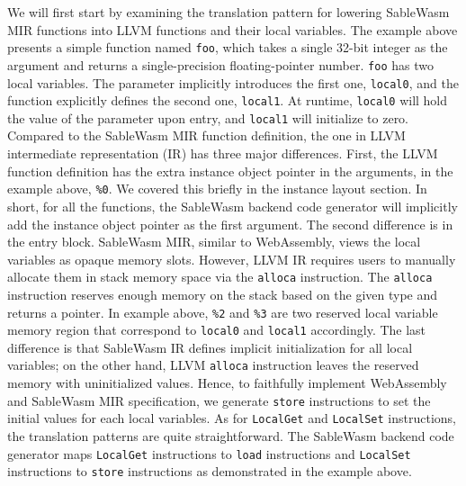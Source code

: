 We will first start by examining the translation pattern for lowering SableWasm
MIR functions into LLVM functions and their local variables. The example above
presents a simple function named \texttt{foo}, which takes a single 32-bit
integer as the argument and returns a single-precision floating-pointer number.
\texttt{foo} has two local variables. The parameter implicitly introduces the
first one, \texttt{local0}, and the function explicitly defines the second one,
\texttt{local1}. At runtime, \texttt{local0} will hold the value of the
parameter upon entry, and \texttt{local1} will initialize to zero. Compared to
the SableWasm MIR function definition, the one in LLVM intermediate
representation (IR) has three major differences. First, the LLVM function
definition has the extra instance object pointer in the arguments, in the
example above, \texttt{\%0}. We covered this briefly in the instance layout
section. In short, for all the functions, the SableWasm backend code generator
will implicitly add the instance object pointer as the first argument. The
second difference is in the entry block. SableWasm MIR, similar to WebAssembly,
views the local variables as opaque memory slots. However, LLVM IR requires
users to manually allocate them in stack memory space via the \texttt{alloca}
instruction. The \texttt{alloca} instruction reserves enough memory on the
stack based on the given type and returns a pointer. In example above,
\texttt{\%2} and \texttt{\%3} are two reserved local variable memory region
that correspond to \texttt{local0} and \texttt{local1} accordingly. The last
difference is that SableWasm IR defines implicit initialization for all local
variables; on the other hand, LLVM \texttt{alloca} instruction leaves the
reserved memory with uninitialized values. Hence, to faithfully implement
WebAssembly and SableWasm MIR specification, we generate \texttt{store}
instructions to set the initial values for each local variables. As for
\texttt{LocalGet} and \texttt{LocalSet} instructions, the translation patterns
are quite straightforward. The SableWasm backend code generator maps
\texttt{LocalGet} instructions to \texttt{load} instructions and
\texttt{LocalSet} instructions to \texttt{store} instructions as demonstrated
in the example above.

